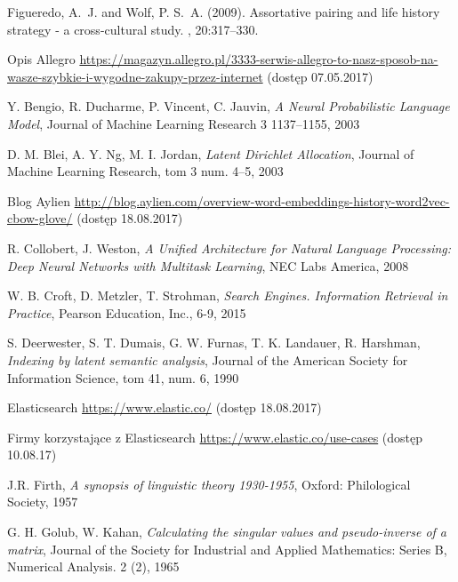 \documentclass[twoside,twocolumn]{article}
\begin{document}
	
	\begin{thebibliography}{99}
		
		Figueredo, A.~J. and Wolf, P. S.~A. (2009).
		\newblock Assortative pairing and life history strategy - a cross-cultural
		study.
		, 20:317--330.
		
		
		Opis Allegro
		\url{https://magazyn.allegro.pl/3333-serwis-allegro-to-nasz-sposob-na-wasze-szybkie-i-wygodne-zakupy-przez-internet}
		(dostęp 07.05.2017)
		
		Y. Bengio, R. Ducharme, P. Vincent, C. Jauvin,
		\emph{A Neural Probabilistic Language Model},
		Journal of Machine Learning Research 3 1137–1155,
		2003
		
		D. M. Blei, A. Y. Ng, M. I. Jordan,
		\emph{Latent Dirichlet Allocation},
		Journal of Machine Learning Research, tom 3 num. 4–5,
		2003
		
		Blog Aylien
		\url{http://blog.aylien.com/overview-word-embeddings-history-word2vec-cbow-glove/}
		(dostęp 18.08.2017)
		
		R. Collobert, J. Weston,
		\emph{A Unified Architecture for Natural Language Processing: Deep Neural Networks with Multitask Learning},
		NEC Labs America,
		2008
		
		W. B. Croft, D. Metzler, T. Strohman,
		\emph{Search Engines. Information Retrieval in Practice},
		Pearson Education, Inc.,
		6-9,
		2015
		
		S. Deerwester, S. T. Dumais, G. W. Furnas, T. K. Landauer, R. Harshman,
		\emph{Indexing by latent semantic analysis},
		Journal of the American Society for Information Science, tom 41, num. 6,
		1990
		
		Elasticsearch
		\url{https://www.elastic.co/}
		(dostęp 18.08.2017)
		
		Firmy korzystające z Elasticsearch
		\url{https://www.elastic.co/use-cases}
		(dostęp 10.08.17)
		
		J.R. Firth,
		\emph{A synopsis of linguistic theory 1930-1955},
		Oxford: Philological Society,
		1957
		
		G. H. Golub, W. Kahan,
		\emph{Calculating the singular values and pseudo-inverse of a matrix},
		Journal of the Society for Industrial and Applied Mathematics: Series B, Numerical Analysis. 2 (2),
		1965
		

\end{thebibliography}
\end{document}
